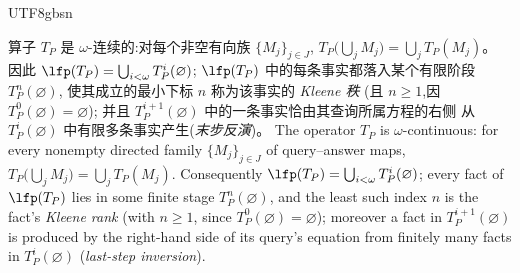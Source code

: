 \begin{CJK*}{UTF8}{gbsn}
\begin{lemma}\label{lem:kleene-iteration}
  \ifPaperChinese
  算子 $T_P$ 是 $\omega$-连续的:对每个非空有向族 $\{M_j\}_{j \in J}$,
  $T_P\bigl(\bigcup_{j} M_j\bigr) = \bigcup_{j} T_P(M_j)$。
  因此 $\lfp(T_P) = \bigcup_{i < \omega} T_P^i(\varnothing)$;
  $\lfp(T_P)$ 中的每条事实都落入某个有限阶段 $T_P^n(\varnothing)$,
  使其成立的最小下标 $n$ 称为该事实的 \emph{Kleene 秩}
  (且 $n \geq 1$,因 $T_P^0(\varnothing) = \varnothing$);
  并且 $T_P^{i+1}(\varnothing)$ 中的一条事实恰由其查询所属方程的右侧
  从 $T_P^i(\varnothing)$ 中有限多条事实产生(\emph{末步反演})。
  \else
  The operator $T_P$ is $\omega$-continuous: for every nonempty directed family
  $\{M_j\}_{j \in J}$ of query--answer maps,
  $T_P\bigl(\bigcup_{j} M_j\bigr) = \bigcup_{j} T_P(M_j)$.
  Consequently $\lfp(T_P) = \bigcup_{i < \omega} T_P^i(\varnothing)$;
  every fact of $\lfp(T_P)$ lies in some finite stage
  $T_P^n(\varnothing)$, and the least such index $n$ is the fact's
  \emph{Kleene rank} (with $n \geq 1$, since
  $T_P^0(\varnothing) = \varnothing$); moreover a fact in
  $T_P^{i+1}(\varnothing)$ is produced by the right-hand side of its
  query's equation from finitely many facts in $T_P^i(\varnothing)$
  (\emph{last-step inversion}).
  \fi
\end{lemma}


\end{CJK*}
